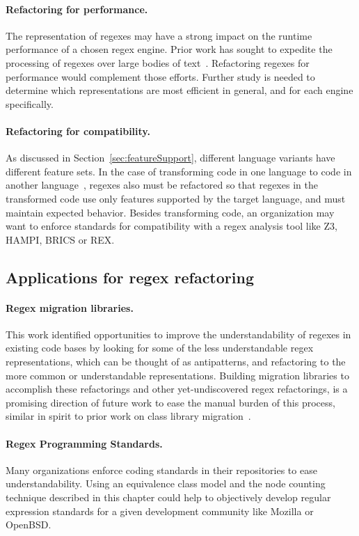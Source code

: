 \paragraph{Refactoring for performance.}  The representation of regexes may have a strong impact on the runtime performance of a chosen regex engine. Prior work has sought to expedite the processing of regexes over large bodies of text~.  Refactoring regexes for performance would complement those efforts.  Further study is needed to determine which representations are most efficient in general, and for each engine specifically.

\paragraph{Refactoring for compatibility.}  As discussed in Section~\ref{sec:featureSupport}, different language variants have different feature sets.  In the case of transforming code in one language to code in another language~, regexes also must be refactored so that regexes in the transformed code use only features supported by the target language, and must maintain expected behavior.  Besides transforming code, an organization may want to enforce standards for compatibility with a regex analysis tool like Z3, HAMPI, BRICS or REX.

\subsection{Applications for regex refactoring}

\paragraph{Regex migration libraries.}  This work identified opportunities to improve the understandability of regexes in existing code bases by looking for some of the less understandable regex representations, which can be thought of as antipatterns, and refactoring to the more common or understandable representations.  Building migration libraries to accomplish these refactorings and other yet-undiscovered regex refactorings, is a promising direction of future work to ease the manual burden of this process, similar in spirit to prior work on class library migration~.

\paragraph{Regex Programming Standards.}  Many organizations enforce coding standards in their repositories to ease understandability.  Using an equivalence class model and the node counting technique described in this chapter could help to objectively develop regular expression standards for a given development community like Mozilla or OpenBSD.
